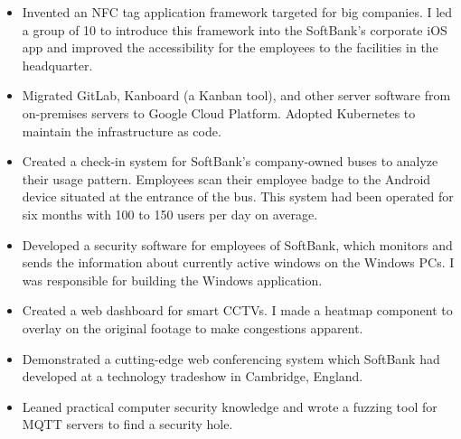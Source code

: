\documentclass[10pt,a4paper,ragged2e,withhyper]{altacv}
\begin{document}
\begin{paracol}{2}

\begin{itemize}
\item 
  Invented an NFC tag application framework targeted for big companies.
  I led a group of 10 to introduce this framework into the SoftBank's corporate iOS app and improved the accessibility for the employees to the facilities in the headquarter.

\item
  Migrated GitLab, Kanboard (a Kanban tool), and other server software from on-premises servers to Google Cloud Platform.
  Adopted Kubernetes to maintain the infrastructure as code.

\item
  Created a check-in system for SoftBank's company-owned buses to analyze their usage pattern.
  Employees scan their employee badge to the Android device situated at the entrance of the bus.
  This system had been operated for six months with 100 to 150 users per day on average.

\item 
  Developed a security software for employees of SoftBank, which monitors and sends the information about currently active windows on the Windows PCs.
  I was responsible for building the Windows application.

\item
  Created a web dashboard for smart CCTVs.
  I made a heatmap component to overlay on the original footage to make congestions apparent. 

\item
  Demonstrated a cutting-edge web conferencing system which SoftBank had developed at a technology tradeshow in Cambridge, England.  

\end{itemize}

\divider


\begin{itemize}
  \item Leaned practical computer security knowledge and wrote a fuzzing tool for MQTT servers to find a security hole.
\end{itemize}


\end{paracol}
\end{document}
